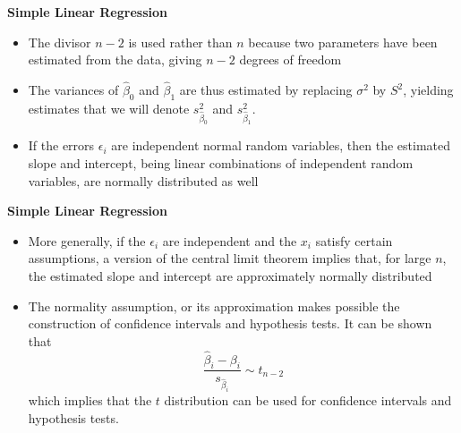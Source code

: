 \documentclass[landscape]{slides}
\newcommand{\heading}[1]{%
  \begin{center}
    \large\bf \color{red}
        #1
  \end{center}
  \vspace{1ex minus 1ex}}
\begin{document}
\begin{slide}
\heading{Simple Linear Regression}
\begin{itemize}

\item The divisor $n-2$ is used rather than $n$ because two parameters
have been estimated from the data, giving $n-2$ degrees of freedom

\item The variances of $\hat{\beta}_0$ and $\hat{\beta}_1$ are thus estimated
by replacing $\sigma^2$ by $S^2$, yielding estimates that we will denote
$s^2_{\hat{\beta}_0}$ and $s^2_{\hat{\beta}_1}$.

\item If the errors $\epsilon_i$ are independent normal random variables, then
the estimated slope and intercept, being linear combinations of independent 
random variables, are normally distributed as well

\end{itemize}
\end{slide}
\begin{slide}
\heading{Simple Linear Regression}
\begin{itemize}
\item More generally, if the $\epsilon_i$ are independent and the $x_i$ satisfy 
certain assumptions, a version of the central limit theorem implies  that, for 
large $n$, the estimated slope and intercept are approximately normally 
distributed

\item The normality assumption, or its approximation makes possible the 
construction of confidence intervals and hypothesis tests. It can be shown that
$$\frac{\hat{\beta}_i-\beta_i}{s_{\hat{\beta}_i}}\sim t_{n-2}$$
which implies that the $t$ distribution can be used for confidence intervals
and hypothesis tests.
\end{itemize}
\end{slide}
\end{document}
